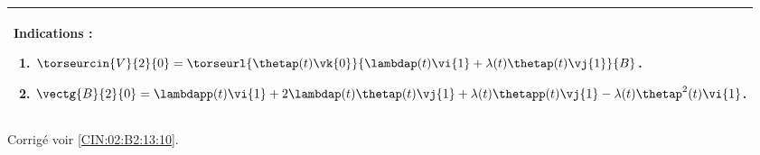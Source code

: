 \ifprof
\else
\footnotesize
\ifcolle
\else
\begin{marginfigure}
\begin{tabular}{|p{.9\linewidth}|}
\hline
Indications :
\begin{enumerate}
\item $\torseurcin{V}{2}{0} = \torseurl{\thetap(t)\vk{0}}{\lambdap(t) \vi{1}+\lambda(t)\thetap(t)\vj{1}}{B}$.
\item $\vectg{B}{2}{0} = \lambdapp(t) \vi{1}+2 \lambdap(t) \thetap(t) \vj{1}+\lambda(t)\thetapp(t)\vj{1}-\lambda(t)\thetap^2(t)\vi{1} $.
\end{enumerate} \\ \hline
\end{tabular}
\end{marginfigure}
\fi

\normalsize
\begin{flushright}
\footnotesize{Corrigé  voir \ref{CIN:02:B2:13:10}.}
\end{flushright}%
\fi

